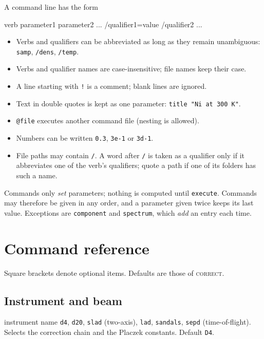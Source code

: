 \documentclass[11pt,a4paper]{report}
\newcommand{\cmd}[1]{\texttt{\color{accent}#1}}
\newcommand{\code}[1]{\texttt{#1}}
\newcommand{\cor}{\textsc{correct}}
\begin{document}
A command line has the form
\begin{com}
verb  parameter1 parameter2 ...  /qualifier1=value /qualifier2 ...
\end{com}
\begin{itemize}
  \item Verbs and qualifiers can be abbreviated as long as they remain
        unambiguous: \code{samp}, \code{/dens}, \code{/temp}.
  \item Verbs and qualifier names are case-insensitive; file names keep their case.
  \item A line starting with \code{!} is a comment; blank lines are ignored.
  \item Text in double quotes is kept as one parameter: \code{title "Ni at 300 K"}.
  \item \code{@file} executes another command file (nesting is allowed).
  \item Numbers can be written \code{0.3}, \code{3e-1} or \code{3d-1}.
  \item File paths may contain \code{/}. A word after \code{/} is taken as a
        qualifier only if it abbreviates one of the verb's qualifiers; quote a
        path if one of its folders has such a name.
\end{itemize}

Commands only \emph{set} parameters; nothing is computed until \cmd{execute}.
Commands may therefore be given in any order, and a parameter given twice keeps
its last value. Exceptions are \cmd{component} and \cmd{spectrum}, which
\emph{add} an entry each time.

\section{Command reference}

Square brackets denote optional items. Defaults are those of \cor.

\subsection{Instrument and beam}

\begin{cmdbox}{instrument  name}
\code{d4}, \code{d20}, \code{slad} (two-axis), \code{lad}, \code{sandals},
\code{sepd} (time-of-flight). Selects the correction chain and the Placzek
constants. Default \code{D4}.
\end{cmdbox}
\end{document}

